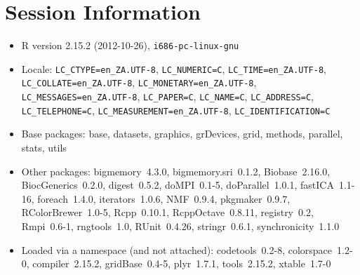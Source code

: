\documentclass[10pt]{article}
\begin{document}
\section*{Session Information}
\begin{itemize}\raggedright
  \item R version 2.15.2 (2012-10-26), \verb|i686-pc-linux-gnu|
  \item Locale: \verb|LC_CTYPE=en_ZA.UTF-8|, \verb|LC_NUMERIC=C|, \verb|LC_TIME=en_ZA.UTF-8|, \verb|LC_COLLATE=en_ZA.UTF-8|, \verb|LC_MONETARY=en_ZA.UTF-8|, \verb|LC_MESSAGES=en_ZA.UTF-8|, \verb|LC_PAPER=C|, \verb|LC_NAME=C|, \verb|LC_ADDRESS=C|, \verb|LC_TELEPHONE=C|, \verb|LC_MEASUREMENT=en_ZA.UTF-8|, \verb|LC_IDENTIFICATION=C|
  \item Base packages: base, datasets, graphics, grDevices, grid,
    methods, parallel, stats, utils
  \item Other packages: bigmemory~4.3.0, bigmemory.sri~0.1.2,
    Biobase~2.16.0, BiocGenerics~0.2.0, digest~0.5.2, doMPI~0.1-5,
    doParallel~1.0.1, fastICA~1.1-16, foreach~1.4.0, iterators~1.0.6,
    NMF~0.9.4, pkgmaker~0.9.7, RColorBrewer~1.0-5, Rcpp~0.10.1,
    RcppOctave~0.8.11, registry~0.2, Rmpi~0.6-1, rngtools~1.0,
    RUnit~0.4.26, stringr~0.6.1, synchronicity~1.1.0
  \item Loaded via a namespace (and not attached): codetools~0.2-8,
    colorspace~1.2-0, compiler~2.15.2, gridBase~0.4-5, plyr~1.7.1,
    tools~2.15.2, xtable~1.7-0
\end{itemize}
\end{document}
